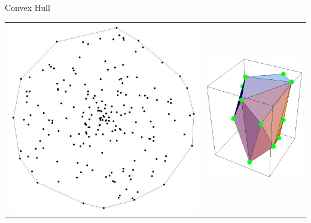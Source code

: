\documentclass{lecture}
\begin{document}
\begin{plain}{Convex Hull}
\begin{tabular}{cc}
\includegraphics[scale=0.14]{figs/2d_convex_hull2} &
\includegraphics[scale=0.3]{figs/3d_convex_hull2}
\end{tabular}
\end{plain}
\end{document}

